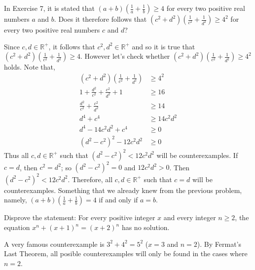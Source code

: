 \documentclass[12pt]{article}
\newcommand{\R}{\mathbb{R}}
\newenvironment{problem}[2][Problem]{\begin{trivlist}
		\item[\hskip \labelsep {\bfseries #1}\hskip \labelsep {\bfseries #2.}]}{\end{trivlist}}
\newenvironment{solution}[2][Solution]{\begin{trivlist}
		\item[\hskip \labelsep {\bfseries #1}\hskip \labelsep {\bfseries #2.}]}{\end{trivlist}}
\begin{document}
	\begin{problem}{8}
		In Exercise 7, it is stated that $(a+b)(\frac{1}{a}+\frac{1}{b})\geq 4$ for every two positive real numbers $a$ and $b$. Does it therefore follows that $(c^{2}+d^{2})\left(\frac{1}{c^{2}}+\frac{1}{d^{2}}\right)\geq 4^{2}$ for every two positive real numbers $c$ and $d$? 
		\begin{solution}{}
			Since $c,d\in \R^{+}$, it follows that $c^{2},d^{2}\in \R^{+}$ and so it is true that $(c^{2}+d^{2})\left(\frac{1}{c^{2}}+\frac{1}{d^{2}}\right)\geq 4$. However let's check whether $(c^{2}+d^{2})\left(\frac{1}{c^{2}}+\frac{1}{d^{2}}\right)\geq 4^{2}$ holds. Note that,
			\begin{align*}
				(c^{2}+d^{2})\left(\frac{1}{c^{2}}+\frac{1}{d^{2}}\right) &\geq 4^{2}\\
				1+\frac{d^{2}}{c^{2}}+\frac{c^{2}}{d^{2}}+1 & \geq 16\\
				\frac{d^{2}}{c^{2}}+\frac{c^{2}}{d^{2}} & \geq 14\\
				d^{4} + c^{4} &\geq 14c^{2}d^{2}\\
				d^{4} -14c^{2}d^{2}+ c^{4} &\geq 0\\
				(d^{2}-c^{2})^{2}-12c^{2}d^{2} &\geq 0
			\end{align*}
		Thus all $c,d\in \R^{+}$ such that $(d^{2}-c^{2})^{2} < 12c^{2}d^{2}$ will be counterexamples. If $c=d$, then $c^{2} = d^{2}$; so $(d^{2}-c^{2})^{2} = 0$ and $12c^{2}d^{2}>0$. Then $(d^{2}-c^{2})^{2} < 12c^{2}d^{2}$. Therefore, all $c,d\in \R^{+}$ such that $c=d$ will be counterexamples. Something that we already knew from the previous problem, namely, $(a+b)\left(\frac{1}{a}+\frac{1}{b}\right) = 4$ if and only if $a=b$. 
		\end{solution}
	\end{problem}   

	\begin{problem}{9}
		Disprove the statement: For every positive integer $x$ and every integer $n\geq 2$, the equation $x^{n}+(x+1)^{n}=(x+2)^{n}$ has no solution.
		\begin{solution}{}
			A very famous counterexample is $3^{2}+4^{2} = 5^{2}$ ($x=3$ and $n=2$). By Fermat's Last Theorem, all posible counterexamples will only be found in the cases where $n=2$.
		\end{solution}
	\end{problem}
\end{document}
